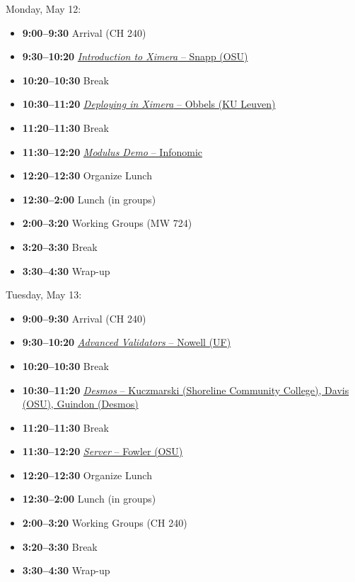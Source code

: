 \documentclass{ximera}
\begin{document}
Monday, May 12:
\begin{itemize}[leftmargin=2em]
    \item \textbf{9:00--9:30} Arrival (CH 240)
    \item \textbf{9:30--10:20} \href{https://mediasite.osu.edu/Mediasite/channel/2b1820c007b84e5ea019ba8a1a238c5b5f/watch/f9aeb9927a8646b6801477cedd6ffcdf1d}{\emph{Introduction to Ximera} -- Snapp (OSU)}
    \item \textbf{10:20--10:30} Break
    \item \textbf{10:30--11:20} \href{https://mediasite.osu.edu/Mediasite/channel/2b1820c007b84e5ea019ba8a1a238c5b5f/watch/f9d267f3f34d43c1a5597843e27b11e21d}{\emph{Deploying in Ximera} -- Obbels (KU Leuven)}
    \item \textbf{11:20--11:30} Break
    \item \textbf{11:30--12:20} \href{https://mediasite.osu.edu/Mediasite/channel/2b1820c007b84e5ea019ba8a1a238c5b5f/watch/2185fc7530f74fc79eccc5d227e64b641d}{\emph{Modulus Demo} -- Infonomic}
    \item \textbf{12:20--12:30} Organize Lunch
    \item \textbf{12:30--2:00} Lunch (in groups)
    \item \textbf{2:00--3:20} Working Groups (MW 724)
    \item \textbf{3:20--3:30} Break
    \item \textbf{3:30--4:30} Wrap-up
\end{itemize}

Tuesday, May 13:
\begin{itemize}[leftmargin=2em]
    \item \textbf{9:00--9:30} Arrival (CH 240)
    \item \textbf{9:30--10:20} \href{https://mediasite.osu.edu/Mediasite/channel/2b1820c007b84e5ea019ba8a1a238c5b5f/watch/cece0488b01f44e997c6fa3b824011861d}{\emph{Advanced Validators} -- Nowell (UF)}
    \item \textbf{10:20--10:30} Break
    \item \textbf{10:30--11:20} \href{https://mediasite.osu.edu/Mediasite/channel/2b1820c007b84e5ea019ba8a1a238c5b5f/watch/89747320363b48cebb05df21cc28db2c1d}{\emph{Desmos} -- Kuczmarski (Shoreline Community College), Davis (OSU), Guindon (Desmos)}
    \item \textbf{11:20--11:30} Break
    \item \textbf{11:30--12:20} \href{https://mediasite.osu.edu/Mediasite/channel/2b1820c007b84e5ea019ba8a1a238c5b5f/watch/a7c5e004ea9f4e959ffd1e8d6cd47faf1d}{\emph{Server} -- Fowler (OSU)}
    \item \textbf{12:20--12:30} Organize Lunch
    \item \textbf{12:30--2:00} Lunch (in groups)
    \item \textbf{2:00--3:20} Working Groups (CH 240)
    \item \textbf{3:20--3:30} Break
    \item \textbf{3:30--4:30} Wrap-up
\end{itemize}
\end{document}
